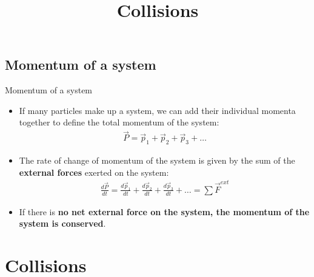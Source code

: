 \documentclass[aspectratio=169,
hyperref={colorlinks,urlcolor=blue}
]{beamer}
\begin{document}
\subsection{Momentum of a system}
\label{subsec:momentumofasystem}
\begin{frame}{Momentum of a system}
\begin{itemize}
\item If many particles make up a system, we can add their individual momenta together to define the total momentum of the system:
\begin{align*}
\vec P = \vec p_1 + \vec p_2 +\vec p_3+\dots
\end{align*}
\item The rate of change of momentum of the system is given by the sum of the \textbf{external forces} exerted on the system:
\begin{align*}
\frac{d\vec P}{dt}=\frac{d\vec p_1}{dt} + \frac{d\vec p_2}{dt}  + \frac{d\vec p_3}{dt} +\dots=  \sum \vec F ^{ext}
\end{align*}
\item If there is \textbf{no net external force on the system, the momentum of the system is conserved}.
\end{itemize}
\end{frame}










\section{Collisions}
\label{sec:collisions}
\title{Collisions}
\author{\insertsubsection}


\begin{frame}
\titlepage
\thispagestyle{empty}
\end{frame}












\end{document}
